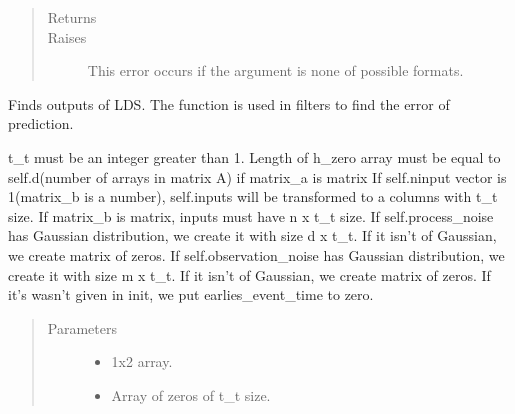 \documentclass[letterpaper,10pt,english]{sphinxmanual}
\begin{document}
\begin{fulllineitems}
\begin{fulllineitems}
\begin{quote}
\begin{description}
\item[{Returns}] \leavevmode
{}

\item[{Raises}] \leavevmode
\sphinxAtStartPar
{} \textendash{} This error occurs if the argument is none of possible formats.

\end{description}\end{quote}

\end{fulllineitems}


\begin{fulllineitems}
\label{\detokenize{LDS.LDS.ds:LDS.LDS.ds.dynamical_system.DynamicalSystem.solve}}
\sphinxAtStartPar
Finds outputs of LDS. The function is used in filters to find the error of prediction.

\sphinxAtStartPar
t\_t must be an integer greater than 1.
Length of h\_zero array must be equal to
self.d(number of arrays in matrix A) if matrix\_a
is matrix
If self.n\sphinxhyphen{}input vector is 1(matrix\_b is a number),
self.inputs will be transformed to a columns with t\_t
size.
If matrix\_b is matrix, inputs must have n x t\_t size.
If self.process\_noise has Gaussian distribution, we
create it with size d x t\_t. If it isn’t of Gaussian,
we create matrix of zeros.
If self.observation\_noise has Gaussian distribution, we
create it with size m x t\_t. If it isn’t of Gaussian,
we create matrix of zeros.
If it’s wasn’t given in init, we put earlies\_event\_time
to zero.
\begin{quote}\begin{description}
\item[{Parameters}] \leavevmode\begin{itemize}
\item {} 
\sphinxAtStartPar
{} \textendash{} 1x2 array.

\item {} 
\sphinxAtStartPar
{} \textendash{} Array of zeros of t\_t size.


\end{itemize}
\end{description}
\end{quote}
\end{fulllineitems}
\end{fulllineitems}
\end{document}
